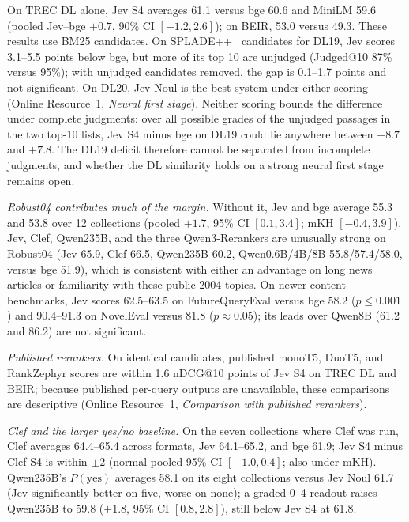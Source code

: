 On TREC DL alone, Jev S4 averages 61.1 versus bge 60.6 and MiniLM 59.6 (pooled Jev--bge $+0.7$, 90\% CI $[-1.2,2.6]$); on BEIR, 53.0 versus 49.3. These results use BM25 candidates. On SPLADE++~\cite{formal2022spladepp} candidates for DL19, Jev scores 3.1--5.5 points below bge, but more of its top 10 are unjudged (Judged@10 87\% versus 95\%); with unjudged candidates removed, the gap is 0.1--1.7 points and not significant. On DL20, Jev Noul is the best system under either scoring (Online Resource~1, \emph{Neural first stage}). Neither scoring bounds the difference under complete judgments: over all possible grades of the unjudged passages in the two top-10 lists, Jev S4 minus bge on DL19 could lie anywhere between $-8.7$ and $+7.8$. The DL19 deficit therefore cannot be separated from incomplete judgments, and whether the DL similarity holds on a strong neural first stage remains open.

\emph{Robust04 contributes much of the margin.} Without it, Jev and bge average 55.3 and 53.8 over 12 collections (pooled $+1.7$, 95\% CI $[0.1,3.4]$; mKH $[-0.4,3.9]$). Jev, Clef, Qwen235B, and the three Qwen3-Rerankers are unusually strong on Robust04 (Jev 65.9, Clef 66.5, Qwen235B 60.2, Qwen0.6B/4B/8B 55.8/57.4/58.0, versus bge 51.9), which is consistent with either an advantage on long news articles or familiarity with these public 2004 topics. On newer-content benchmarks, Jev scores 62.5--63.5 on FutureQueryEval versus bge 58.2 ($p\le0.001$) and 90.4--91.3 on NovelEval versus 81.8 ($p\approx0.05$); its leads over Qwen8B (61.2 and 86.2) are not significant.

\emph{Published rerankers.} On identical candidates, published monoT5, DuoT5, and RankZephyr scores are within 1.6 nDCG@10 points of Jev S4 on TREC DL and BEIR; because published per-query outputs are unavailable, these comparisons are descriptive (Online Resource~1, \emph{Comparison with published rerankers}).

\emph{Clef and the larger yes/no baseline.} On the seven collections where Clef was run, Clef averages 64.4--65.4 across formats, Jev 64.1--65.2, and bge 61.9; Jev S4 minus Clef S4 is within $\pm2$ (normal pooled 95\% CI $[-1.0,0.4]$; also under mKH). Qwen235B's $P(\text{yes})$ averages 58.1 on its eight collections versus Jev Noul 61.7 (Jev significantly better on five, worse on none); a graded 0--4 readout raises Qwen235B to 59.8 ($+1.8$, 95\% CI $[0.8,2.8]$), still below Jev S4 at 61.8.

